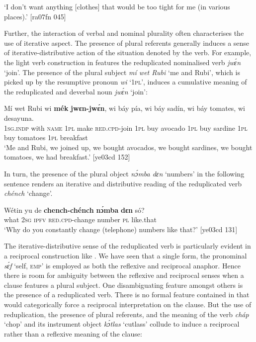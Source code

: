 \glt ‘I don’t want anything [clothes] that would be too tight for me (in various places).’ [ra07fn 045]
\z

Further, the interaction of verbal and nominal plurality often characterises the use of iterative aspect. The presence of plural referents generally induces a sense of iterative-distributive action of the situation denoted by the verb. For example, the light verb construction in  features the reduplicated nominalised verb \textit{jwɛ́n} ‘join’. The presence of the plural subject \textit{mí wet Rubi} ‘me and Rubi’, which is picked up by the resumptive pronoun{\fff} \textit{wi} ‘\textsc{1pl}’, induces a cumulative meaning of the reduplicated and deverbal noun \textit{jwɛ́n} ‘join’:


\ea%
    \label{ex:key:140}
    \gll Mí    wet    Rubi    wi  \textbf{mék}    \textbf{jwɛn-jwɛ́n},  wi  báy  pía,
wi  báy  sadín,  wi  báy  tomates,    wi  desayuna.\\
\textsc{1sg.indp}  with    \textsc{name}  \textsc{1pl}  make  \textsc{red}.\textsc{cpd}{}-join  \textsc{1pl}  buy  avocado
\textsc{1pl}  buy  sardine  \textsc{1pl}  buy  tomatoes  \textsc{1pl}  breakfast\\
\glt ‘Me and Rubi, we joined up, we bought avocados, we bought sardines, we 
bought tomatoes, we had breakfast.’ [ye03cd 152]
\z

In turn, the presence of the plural object \textit{nɔ́mba dɛn} ‘numbers’ in the following sentence renders an iterative and distributive reading of the reduplicated verb \textit{chénch} ‘change’. 


\ea%
    \label{ex:key:141}
    \gll Wétin  yu  de \textbf{  chench-chénch}  \textbf{nɔ́mba}  \textbf{dɛn}  só?\\
what  \textsc{2sg}  \textsc{ipfv}  {\textsc{red.cpd-}change}  number  \textsc{pl}  like.that\\

\glt ‘Why do you constantly change (telephone) numbers like that?’ [ye03cd 131]
\z

The iterative-distributive sense of the reduplicated verb is particularly evident in a reciprocal{\fff} construction like . We have seen that a single form, the pronominal \textit{sɛ́f} ‘self, \textsc{emp}’ is employed as both the reflexive{\fff} and reciprocal anaphor. Hence there is room for ambiguity between the reflexive and reciprocal senses when a clause features a plural subject. One disambiguating feature amongst others is the presence of a reduplicated verb. There is no formal feature contained in  that would categorically force a reciprocal interpretation on the clause. But the use of reduplication, the presence of plural referents, and the meaning of the verb \textit{cháp} ‘chop’ and its instrument{\fff} object \textit{kɔ́tlas} ‘cutlass’ collude to induce a reciprocal rather than a reflexive meaning of the clause: 


